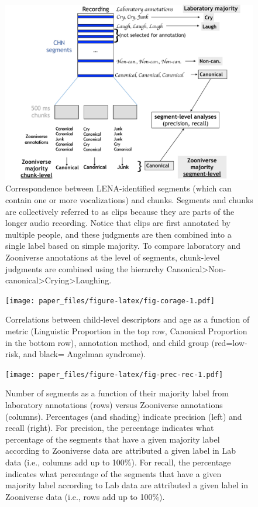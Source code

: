 \documentclass[english,,man]{apa6}
\begin{document}
\begin{figure}
\centering
\includegraphics{fig_levels.key.pdf}
\caption{\label{fig:fig-process}Correspondence between LENA-identified segments (which can contain one or more vocalizations) and chunks. Segments and chunks are collectively referred to as clips because they are parts of the longer audio recording. Notice that clips are first annotated by multiple people, and these judgments are then combined into a single label based on simple majority. To compare laboratory and Zooniverse annotations at the level of segments, chunk-level judgments are combined using the hierarchy Canonical\textgreater{}Non-canonical\textgreater{}Crying\textgreater{}Laughing.}
\end{figure}

\begin{figure}
\centering
\texttt{[image: paper\_files/figure-latex/fig-corage-1.pdf]}
\caption{\label{fig:fig-corage}Correlations between child-level descriptors and age as a function of metric (Linguistic Proportion in the top row, Canonical Proportion in the bottom row), annotation method, and child group (red=low-risk, and black= Angelman syndrome).}
\end{figure}

\begin{figure}
\centering
\texttt{[image: paper\_files/figure-latex/fig-prec-rec-1.pdf]}
\caption{\label{fig:fig-prec-rec}Number of segments as a function of their majority label from laboratory annotations (rows) versus Zooniverse annotations (columns). Percentages (and shading) indicate precision (left) and recall (right). For precision, the percentage indicates what percentage of the segments that have a given majority label according to Zooniverse data are attributed a given label in Lab data (i.e., columns add up to 100\%). For recall, the percentage indicates what percentage of the segments that have a given majority label according to Lab data are attributed a given label in Zooniverse data (i.e., rows add up to 100\%).}
\end{figure}
\end{document}
